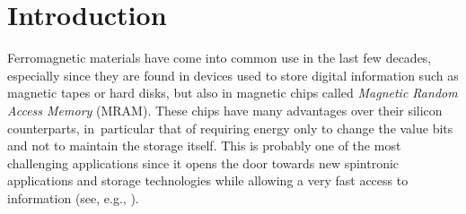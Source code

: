 \documentclass[JEP,XML,SOM,Unicode,NoEqCountersInSection,NoFloatCountersInSection,published]{cedram}
\theoremstyle{definition}
\begin{document}
\maketitle
{\let\nobreakspace\xspace\tableofcontents}


\section{Introduction}
Ferromagnetic materials have come into common use in the last few decades, especially since they are found in devices used to store digital information such as magnetic tapes or hard disks, but also in magnetic chips called \emph{Magnetic Random Access Memory} (MRAM). These chips have many advantages over their silicon counterparts, in~particular that of requiring energy only to change the value bits and not to maintain the storage itself. This is probably one of the most challenging applications since it opens the door towards new spintronic applications and storage technologies while allowing a very fast access to information (see, e.g., \cite{parkin2008magnetic}).
\end{document}

